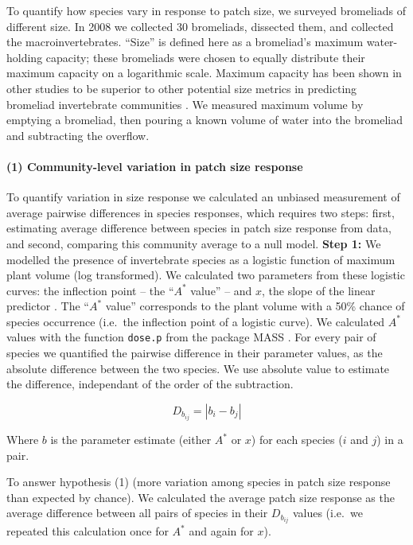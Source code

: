 To quantify how species vary in response to patch size, we surveyed
bromeliads of different size. In 2008 we collected 30 bromeliads,
dissected them, and collected the macroinvertebrates. “Size” is defined here as a bromeliad’s maximum water-holding capacity; these bromeliads
were chosen to equally distribute their maximum capacity on a logarithmic
scale. Maximum capacity has been shown in other
studies to be superior to other potential size metrics in predicting
bromeliad invertebrate communities \citep{Srivastava2008, Marino2011}.
We measured maximum volume by emptying a bromeliad, then pouring a known
volume of water into the bromeliad and subtracting the overflow.

\paragraph{(1) Community-level variation in patch size
response}\label{community-level-variation-in-patch-size-response}

To quantify variation in size response we calculated an unbiased
measurement of average pairwise differences in species responses, which
requires two steps: first, estimating average difference between species
in patch size response from data, and second, comparing this community
average to a null model. \textbf{Step 1:} We modelled the presence of
invertebrate species as a logistic function of maximum plant volume (log
transformed). We calculated two parameters from these logistic curves: the inflection point -- the
``\(A^{*}\) value'' -- and \(x\), the slope of the linear predictor
\citep{Ovaskainen2003}. The ``\(A^{*}\) value'' corresponds to the plant
volume with a 50\% chance of species occurrence (i.e.~the inflection
point of a logistic curve). We calculated \(A^{*}\) values with the function
\texttt{dose.p} from the package MASS \citep{mass}. For every pair of species we quantified the
pairwise difference in their parameter values, as the absolute
difference between the two species. We use absolute value to estimate the difference, independant of the order of the subtraction.

\[D_{b_{ij}} = |b_{i} - b_{j}|\]

Where \(b\) is the parameter estimate (either \(A^{*}\) or \(x\)) for
each species (\(i\) and \(j\)) in a pair.

To answer hypothesis (1) (more variation among species
in patch size response than expected by chance). We calculated the average patch size response as the average difference
between all pairs of species in their \(D_{b_{ij}}\) values (i.e.~we repeated this calculation once for \(A^{*}\) and again for \(x\)).

